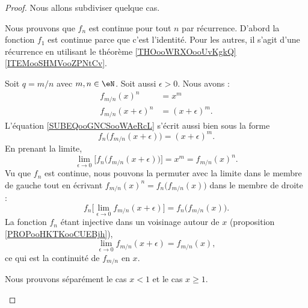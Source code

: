 \begin{proof}
	Nous allons subdiviser quelque cas.
	\begin{subproof}
		Nous prouvons que \( f_n\) est continue pour tout \( n\) par récurrence. D'abord la fonction \( f_1\) est continue parce que c'est l'identité. Pour les autres, il s'agit d'une récurrence en utilisant le théorème \ref{THOooWRXOooUvKgkQ}\ref{ITEMooSHMVooZPNtCv}.

		Soit \( q=m/n\) avec \( m,n\in \eN\). Soit aussi \( \epsilon>0\). Nous avons :
		\begin{subequations}
			\begin{align}
				f_{m/n}(x)^n          & =x^m                                              \\
				f_{m/n}(x+\epsilon)^n & =(x+\epsilon)^m.      \label{SUBEQooGNCSooWAeRcL}
			\end{align}
		\end{subequations}
		L'équation \eqref{SUBEQooGNCSooWAeRcL} s'écrit aussi bien sous la forme
		\begin{equation}
			f_n\big( f_{m/n}(x+\epsilon) \big)=(x+\epsilon)^m.
		\end{equation}
		En prenant la limite,
		\begin{equation}
			\lim_{\epsilon\to 0}\big[ f_n\big( f_{m/n}(x+\epsilon) \big) \big]=x^m=f_{m/n}(x)^n.
		\end{equation}
		Vu que \( f_n\) est continue, nous pouvons la permuter avec la limite dans le membre de gauche tout en écrivant \( f_{m/n}(x)^n=f_n\big( f_{m/n}(x) \big)\) dans le membre de droite :
		\begin{equation}
			f_n\big[ \lim_{\epsilon\to 0}f_{m/n}(x+\epsilon) \big]=f_n\big( f_{m/n}(x) \big).
		\end{equation}
		La fonction \( f_n\) étant injective dans un voisinage autour de \( x\) (proposition \ref{PROPooHKTKooCUEBjh}),
		\begin{equation}
			\lim_{\epsilon\to 0}f_{m/n}(x+\epsilon)=f_{m/n}(x),
		\end{equation}
		ce qui est la continuité de \( f_{m/n}\) en \( x\).


		Nous prouvons séparément le cas \( x<1\) et le cas \( x\geq 1\).

		\begin{subproof}


\end{subproof}
\end{subproof}
\end{proof}
